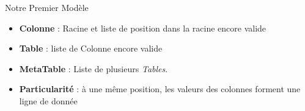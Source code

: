 \documentclass[aspectratio=43,12pt]{beamer}
\begin{document}
\begin{frame}{Notre Premier Modèle}
    \begin{center}
    \end{center}

    \begin{itemize}
        \item \textbf{Colonne} : Racine et liste de position dans la racine encore valide
        \item \textbf{Table} : liste de Colonne encore valide
        \item \textbf{MetaTable} : Liste de plusieurs \textit{Tables}.
        \item \textbf{Particularité} : à une même position, les valeurs des colonnes forment une ligne de donnée
    \end{itemize}
\end{frame}
\end{document}
